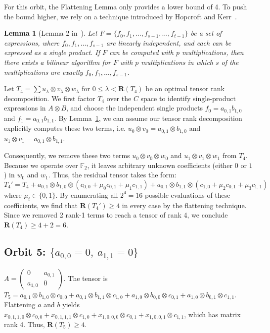 \documentclass[11pt]{article}
\newtheorem{lemma}{Lemma}
\begin{document}
For this orbit, the Flattening Lemma only provides a lower bound of 4. To push the bound higher, we rely on a technique introduced by Hopcroft and Kerr~\cite{hopcroft1971minimizing}.

\begin{lemma}[Lemma 2 in~\cite{hopcroft1971minimizing}]\label{lem:lemma-2}
  Let $F=\{f_0, f_1, \ldots, f_{s-1}, \ldots, f_{t-1}\}$ be a set of expressions, where $f_0, f_1, \ldots, f_{s-1}$ are linearly independent, and each can be expressed as a single product. If $F$ can be computed with $p$ multiplications, then there exists a bilinear algorithm for $F$ with $p$ multiplications in which $s$ of the multiplications are exactly $f_0, f_1, \ldots, f_{s-1}$.
\end{lemma}

Let $T_4=\sum u_\lambda \otimes v_\lambda \otimes w_\lambda$ for $0\leq \lambda < \mathbf{R}(T_4)$ be an optimal tensor rank decomposition.  We first factor $T_4$ over the $C$ space to identify single-product expressions in $A \otimes B$, and choose the independent single products $f_0 = a_{0,1} b_{1,0}$ and $f_1 = a_{0,1} b_{1,1}$. By Lemma~\ref{lem:lemma-2}, we can assume our tensor rank decomposition explicitly computes these two terms, i.e. $u_0 \otimes v_0 = a_{0,1} \otimes b_{1,0}$ and $u_1 \otimes v_1 = a_{0,1} \otimes b_{1,1}$.

Consequently, we remove these two terms $u_0 \otimes v_0 \otimes w_0$ and $u_1 \otimes v_1 \otimes w_1$ from $T_4$. Because we operate over $\mathbb{F}_2$, it leaves arbitrary unknown coefficients (either $0$ or $1$) in $w_0$ and $w_1$. Thus, the residual tensor takes the form:
$$T_4' = T_4 + a_{0,1} \otimes b_{1,0} \otimes (c_{0,0} + \mu_0 c_{0,1} + \mu_1 c_{1,1}) + a_{0,1} \otimes b_{1,1} \otimes (c_{1,0} + \mu_2 c_{0,1} + \mu_3 c_{1,1})$$
where $\mu_i \in \{0,1\}$. By enumerating all $2^4=16$ possible evaluations of these coefficients, we find that $\mathbf{R}(T_4')\geq 4$ in every case by the flattening technique. Since we removed 2 rank-1 terms to reach a tensor of rank 4, we conclude $\mathbf{R} (T_4) \geq 4+2=6$.

\subsection*{Orbit 5: $\{a_{0,0}=0,\ a_{1,1}=0\}$}
$A=
  \begin{pmatrix}
    0       & a_{0,1} \\
    a_{1,0} & 0
  \end{pmatrix}$.
The tensor is $T_5 = a_{0,1} \otimes b_{1,0} \otimes c_{0,0} + a_{0,1} \otimes b_{1,1} \otimes c_{1,0} + a_{1,0} \otimes b_{0,0} \otimes c_{0,1} + a_{1,0} \otimes b_{0,1} \otimes c_{1,1}$.
Flattening $a$ and $b$ yields $x_{0,1,1,0} \otimes c_{0,0} + x_{0,1,1,1} \otimes c_{1,0} + x_{1,0,0,0} \otimes c_{0,1} + x_{1,0,0,1} \otimes c_{1,1}$, which has matrix rank 4. Thus, $\mathbf{R} (T_5) \geq 4$.
\end{document}
